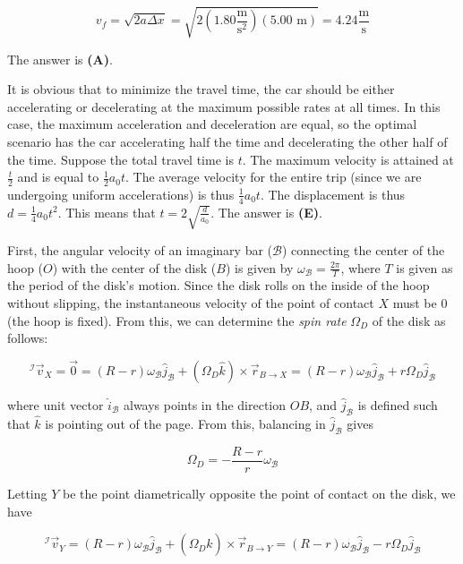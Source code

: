 \documentclass[12pt]{article}
\begin{document}
$$v_f = \sqrt{2 a \Delta x} = \sqrt{2 \left( 1.80 \frac{\text{m}}{\text{s}^2} \right) (5.00 \text{ m})} = 4.24 \frac{\text{m}}{\text{s}}$$

The answer is \textbf{(A)}.


\vspace{2 \baselineskip}



It is obvious that to minimize the travel time, the car should be either accelerating or decelerating at the maximum possible rates at all times. In this case, the maximum acceleration and deceleration are equal, so the optimal scenario has the car accelerating half the time and decelerating the other half of the time. Suppose the total travel time is $t$. The maximum velocity is attained at $\frac{t}{2}$ and is equal to $\frac{1}{2} a_0 t$. The average velocity for the entire trip (since we are undergoing uniform accelerations) is thus $\frac{1}{4} a_0 t$. The displacement is thus $d = \frac{1}{4} a_0 t^2$. This means that $t = 2 \sqrt{\frac{d}{a_0}}$. The answer is \textbf{(E)}.


\vspace{2 \baselineskip}



First, the angular velocity of an imaginary bar ($\mathcal{B}$) connecting the center of the hoop ($O$) with the center of the disk ($B$) is given by $\omega_\mathcal{B} = \frac{2 \pi}{T}$, where $T$ is given as the period of the disk's motion. Since the disk rolls on the inside of the hoop without slipping, the instantaneous velocity of the point of contact $X$ must be $0$ (the hoop is fixed). From this, we can determine the \textit{spin rate} $\Omega_D$ of the disk as follows:

$$^\mathcal{I} \vec{v}_X = \vec{0} = (R - r) \omega_\mathcal{B} \hat{j}_\mathcal{B} + (\Omega_D \hat{k}) \times \vec{r}_{B \to X} = (R - r) \omega_\mathcal{B} \hat{j}_\mathcal{B} + r \Omega _D \hat{j}_\mathcal{B}$$

where unit vector $\hat{i}_\mathcal{B}$ always points in the direction $OB$, and $\hat{j}_\mathcal{B}$ is defined such that $\hat{k}$ is pointing out of the page. From this, balancing in $\hat{j}_\mathcal{B}$ gives

$$\Omega_D = -\frac{R - r}{r} \omega_\mathcal{B}$$

Letting $Y$ be the point diametrically opposite the point of contact on the disk, we have

$$^\mathcal{I} \vec{v}_Y = (R - r) \omega_\mathcal{B} \hat{j}_\mathcal{B} + (\Omega_D \hat{k}) \times \vec{r}_{B \to Y} = (R - r) \omega_\mathcal{B} \hat{j}_\mathcal{B} - r \Omega_D \hat{j}_\mathcal{B}$$
\end{document}
